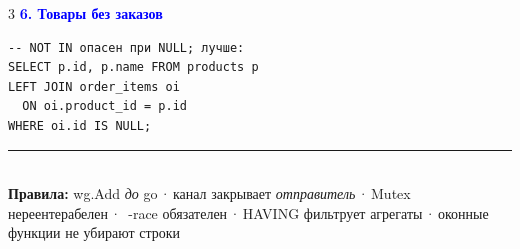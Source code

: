 \documentclass[8.5pt,a4paper]{article}
\newcommand{\hl}[2]{\textbf{\textcolor{#1}{#2}}}
\begin{document}
\begin{multicols}{3}
\hl{blue}{6. Товары без заказов}
\begin{lstlisting}[style=sqlcode]
-- NOT IN опасен при NULL; лучше:
SELECT p.id, p.name FROM products p
LEFT JOIN order_items oi
  ON oi.product_id = p.id
WHERE oi.id IS NULL;
\end{lstlisting}

\vfill
\textcolor{border}{\rule{\columnwidth}{0.4pt}}\\[0.5pt]
{\fontsize{5.8}{7}\color{muted}
  \textbf{Правила:} wg.Add \emph{до} go\,·\,канал закрывает \emph{отправитель}\,·\,Mutex нереентерабелен\,·\,%
  -race обязателен\,·\,HAVING фильтрует агрегаты\,·\,оконные функции не убирают строки%
}

\end{multicols}
\end{document}
